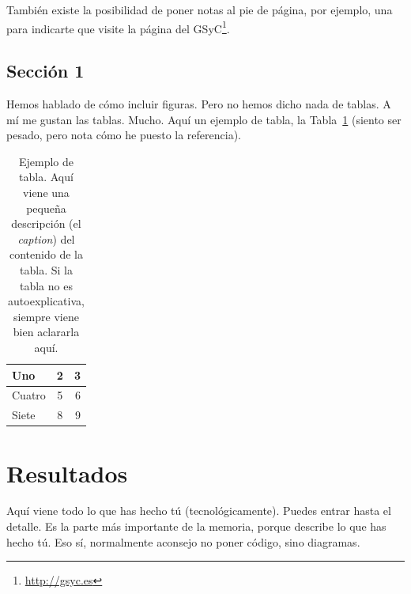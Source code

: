 \documentclass[a4paper, 12pt]{book}
\begin{document}
También existe la posibilidad de poner notas al pie de página, por ejemplo, una para indicarte que visite la página del GSyC\footnote{\url{http://gsyc.es}}.



\section{Sección 1} 
\label{sec:seccion1}

Hemos hablado de cómo incluir figuras.
Pero no hemos dicho nada de tablas.
A mí me gustan las tablas.
Mucho.
Aquí un ejemplo de tabla, la Tabla~\ref{tabla:ejemplo} (siento ser pesado, pero nota cómo he puesto la referencia).

\begin{table}
 \begin{center}
  \begin{tabular}{ | l | c | r |} %
    \hline
    Uno & 2 & 3 \\ \hline %
    Cuatro & 5 & 6 \\ \hline
    Siete & 8 & 9 \\
    \hline
  \end{tabular}
  \label{tabla:ejemplo}
  \caption{Ejemplo de tabla. Aquí viene una pequeña descripción (el \emph{caption}) del contenido de la tabla. Si la tabla no es autoexplicativa, siempre viene bien aclararla aquí.}
 \end{center}
\end{table}




\cleardoublepage
\chapter{Resultados}

Aquí viene todo lo que has hecho tú (tecnológicamente). 
Puedes entrar hasta el detalle. 
Es la parte más importante de la memoria, porque describe lo que has hecho tú.
Eso sí, normalmente aconsejo no poner código, sino diagramas.
\end{document}
